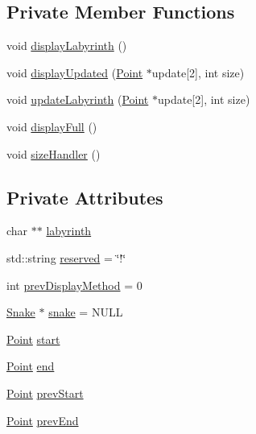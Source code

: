 \subsection*{Private Member Functions}
\begin{DoxyCompactItemize}
\item 
void \mbox{\hyperlink{class_labyrinth_a676e53a7bced45343af8307eae2ba2d0}{display\+Labyrinth}} ()
\item 
void \mbox{\hyperlink{class_labyrinth_a86210707e3b4be4faaa9bd1f86429124}{display\+Updated}} (\mbox{\hyperlink{common_8h_aa9cfdb80b4ca12013a2de8a3b9b97981}{Point}} $\ast$update\mbox{[}2\mbox{]}, int size)
\item 
void \mbox{\hyperlink{class_labyrinth_ad533aaa69e845e368a7a08097f7e4ac8}{update\+Labyrinth}} (\mbox{\hyperlink{common_8h_aa9cfdb80b4ca12013a2de8a3b9b97981}{Point}} $\ast$update\mbox{[}2\mbox{]}, int size)
\item 
void \mbox{\hyperlink{class_labyrinth_a98447444cafe6d19e0e5c0181f3c1ddd}{display\+Full}} ()
\item 
void \mbox{\hyperlink{class_labyrinth_a43994d3b84ed457b1c04595466a61fc6}{size\+Handler}} ()
\end{DoxyCompactItemize}
\subsection*{Private Attributes}
\begin{DoxyCompactItemize}
\item 
char $\ast$$\ast$ \mbox{\hyperlink{class_labyrinth_ac95a1b4246b9351e8cea8c1618bcb58d}{labyrinth}}
\item 
std\+::string \mbox{\hyperlink{class_labyrinth_aafa921122b2ea77268cbe479949d7d39}{reserved}} = \char`\"{}!\char`\"{}
\item 
int \mbox{\hyperlink{class_labyrinth_a7ddef18e25e03408485e4959bcb5aebc}{prev\+Display\+Method}} = 0
\item 
\mbox{\hyperlink{class_snake}{Snake}} $\ast$ \mbox{\hyperlink{class_labyrinth_a09a46368bfd83ccb75580687cb17b92f}{snake}} = N\+U\+LL
\item 
\mbox{\hyperlink{common_8h_aa9cfdb80b4ca12013a2de8a3b9b97981}{Point}} \mbox{\hyperlink{class_labyrinth_a92649fa3b24fcc869418b54e7362e24f}{start}}
\item 
\mbox{\hyperlink{common_8h_aa9cfdb80b4ca12013a2de8a3b9b97981}{Point}} \mbox{\hyperlink{class_labyrinth_a5536b8752cb3c2ef273360e14224bc6f}{end}}
\item 
\mbox{\hyperlink{common_8h_aa9cfdb80b4ca12013a2de8a3b9b97981}{Point}} \mbox{\hyperlink{class_labyrinth_a23e08d55e3a627e8a0d828d05be03253}{prev\+Start}}
\item 
\mbox{\hyperlink{common_8h_aa9cfdb80b4ca12013a2de8a3b9b97981}{Point}} \mbox{\hyperlink{class_labyrinth_a9041d96d4328dea374deb81ff08bd35c}{prev\+End}}
\end{DoxyCompactItemize}


